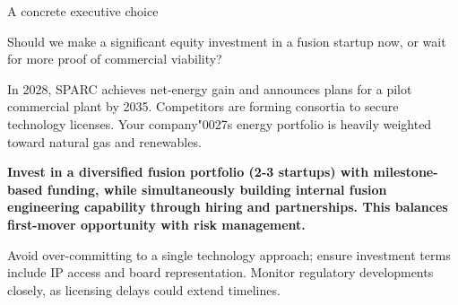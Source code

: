 \documentclass[10pt,a4paper]{article}
\newcommand{\BOApos}{{\BOQuoteFont\char"0027}}
\begin{document}
\clearpage
{\sffamily\fontsize{22}{27}\selectfont\color{BONavy} A concrete executive choice}\par\vspace{10pt}
\begin{minipage}[t]{0.43\linewidth}
{\sffamily\fontsize{17}{22}\selectfont\color{BOGreen} Should we make a significant equity investment in a fusion startup now, or wait for more proof of commercial viability?}\par
\end{minipage}\hfill\begin{minipage}[t]{0.50\linewidth}
{\small In 2028, SPARC achieves net-energy gain and announces plans for a pilot commercial plant by 2035. Competitors are forming consortia to secure technology licenses. Your company\BOApos{}s energy portfolio is heavily weighted toward natural gas and renewables.}\par
{\small\bfseries\color{BOText} Invest in a diversified fusion portfolio (2-3 startups) with milestone-based funding, while simultaneously building internal fusion engineering capability through hiring and partnerships. This balances first-mover opportunity with risk management.}\par\vspace{5pt}
{\footnotesize\color{BOMuted} Avoid over-committing to a single technology approach; ensure investment terms include IP access and board representation. Monitor regulatory developments closely, as licensing delays could extend timelines.}\par\end{minipage}
\end{document}
